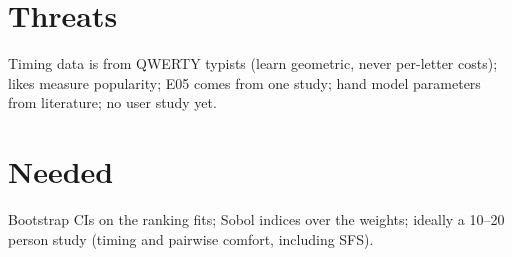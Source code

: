 \documentclass{gecko-paper}
\begin{document}
\begin{paperbody}
\section{Threats}

Timing data is from QWERTY typists (learn geometric, never per-letter
costs); likes measure popularity; E05 comes from one study; hand model
parameters from literature; no user study yet.

\section{Needed}

Bootstrap CIs on the ranking fits; Sobol indices over the weights;
ideally a 10–20 person study (timing and pairwise comfort, including
SFS).

\end{paperbody}
\end{document}

